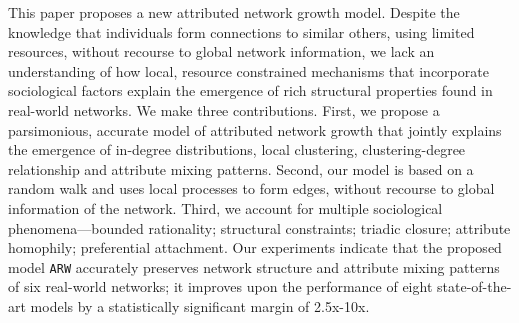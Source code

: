 
This paper proposes a new attributed network growth model. Despite the knowledge that individuals form connections to similar others, using limited resources, without recourse to global network information, we lack an understanding of how local, resource constrained mechanisms that incorporate sociological factors explain the emergence of rich structural properties found in real-world networks. We make three contributions. First, we propose a parsimonious, accurate model of attributed network growth that jointly explains
the emergence of in-degree distributions, local clustering, clustering-degree
relationship and attribute mixing patterns. Second, our model is based on a random walk and uses local processes to form edges, without recourse to global information of the network. Third, we account for multiple sociological phenomena---bounded rationality; structural constraints; triadic closure; attribute homophily; preferential attachment.
Our experiments indicate that the proposed model \texttt{ARW} accurately preserves network structure
and attribute mixing patterns of six real-world networks; it improves upon
the performance of eight state-of-the-art models by a statistically significant margin of 2.5x-10x.
%
%
